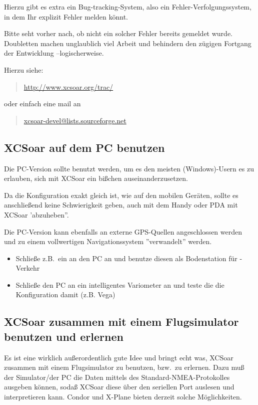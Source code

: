 Hierzu gibt es extra ein Bug-tracking-System, also ein Fehler-Verfolgungssystem, in dem Ihr explizit Fehler melden könnt.

Bitte seht vorher nach, ob nicht ein solcher Fehler bereits gemeldet wurde. 
Doubletten machen unglaublich viel Arbeit und behindern den zügigen Fortgang der Entwicklung --logischerweise.  


Hierzu siehe:  
\begin{quote}
\url{http://www.xcsoar.org/trac/}
\end{quote}
oder einfach eine mail an 
\begin{quote}
\url{xcsoar-devel@lists.sourceforge.net}
\end{quote} 

\subsection*{\textsf{XCSoar} auf dem PC benutzen}
Die PC-Version sollte benutzt werden, um es den meisten (Windows)-Usern es zu erlauben, sich mit \textsf{XCSoar} ein 
bißchen auseinanderzusetzen. 

Da die Konfiguration exakt gleich ist, wie auf den mobilen Geräten, sollte es anschließend keine Schwierigkeit geben,
auch mit dem Handy oder PDA mit \textsf{XCSoar} 'abzuheben''.


Die PC-Version kann ebenfalls an externe GPS-Quellen angeschlossen werden und zu einem 
vollwertigen Navigationssystem ''verwandelt'' werden. 


\begin{itemize}
\item Schließe z.B.\ ein \fl an den PC an und benutze diesen als Bodenstation für \fl-Verkehr
\item Schließe den PC an ein intelligentes Variometer an und teste die die Konfiguration damit  (z.B. Vega)
\end{itemize}

\subsection*{\textsf{XCSoar} zusammen mit einem Flugsimulator benutzen und erlernen}
Es ist eine wirklich außerordentlich gute Idee und bringt echt was, \textsf{XCSoar} zusammen mit einem Flugsimulator zu benutzen, bzw.\ zu erlernen.
Dazu muß der Simulator/der PC die Daten mittels des Standard-NMEA-Protokolles ausgeben können, sodaß  \textsf{XCSoar} diese über den seriellen Port auslesen und interpretieren kann.
{\sc Condor} und {\sc X-Plane} bieten derzeit solche Möglichkeiten.  

